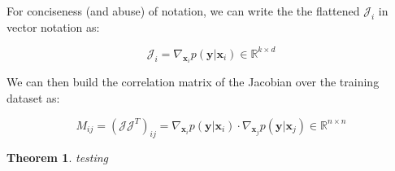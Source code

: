 \documentclass{article}
\newtheorem{theorem}{Theorem}
\newcommand{\R}{\mathbb{R}}
\newcommand{\matr}[1]{\mathbf{#1}}
\begin{document}
For conciseness (and abuse) of notation, we can write the the flattened $\mathcal{J}_i$ in vector notation as:

\begin{equation}
\mathcal{J}_i = \nabla_{\matr{x}_i} p(\matr{y} | \matr{x}_i) \in \R^{k \times d}
\end{equation}

We can then build the correlation matrix of the Jacobian over the training dataset as:

\begin{equation}
M_{ij} = (\mathcal{J} \mathcal{J}^T)_{ij} = \nabla_{\matr{x}_i} p(\matr{y}|\matr{x}_i) \cdot \nabla_{\matr{x}_j} p(\matr{y}|\matr{x}_j) \in \R^{n \times n} 
\end{equation}

\begin{theorem}
testing
\end{theorem}




\end{document}
